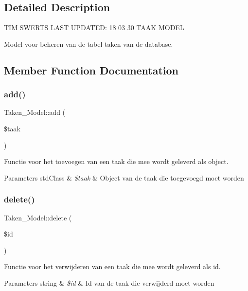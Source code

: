 \subsection{Detailed Description}
T\+IM S\+W\+E\+R\+TS L\+A\+ST U\+P\+D\+A\+T\+ED\+: 18 03 30 T\+A\+AK M\+O\+D\+EL

Model voor beheren van de tabel taken van de database. 

\subsection{Member Function Documentation}
\mbox{\label{class_taken___model_a4ef6e4ab1c71556c29cdc6549e8c888b}} 
\subsubsection{\texorpdfstring{add()}{add()}}
{\footnotesize\ttfamily Taken\+\_\+\+Model\+::add (\begin{DoxyParamCaption}\item[{}]{\$taak }\end{DoxyParamCaption})}

Functie voor het toevoegen van een taak die mee wordt geleverd als object. 
\begin{DoxyParams}[1]{Parameters}
std\+Class & {\em \$taak} & Object van de taak die toegevoegd moet worden \\
\hline
\end{DoxyParams}
\mbox{\label{class_taken___model_ab00c14e7a0a268dc3f708b45f3bd172b}} 
\subsubsection{\texorpdfstring{delete()}{delete()}}
{\footnotesize\ttfamily Taken\+\_\+\+Model\+::delete (\begin{DoxyParamCaption}\item[{}]{\$id }\end{DoxyParamCaption})}

Functie voor het verwijderen van een taak die mee wordt geleverd als id. 
\begin{DoxyParams}[1]{Parameters}
string & {\em \$id} & Id van de taak die verwijderd moet worden \\
\hline
\end{DoxyParams}
\mbox{\label{class_taken___model_ab8c238bca4fc5170294717b94c875cc3}} 

